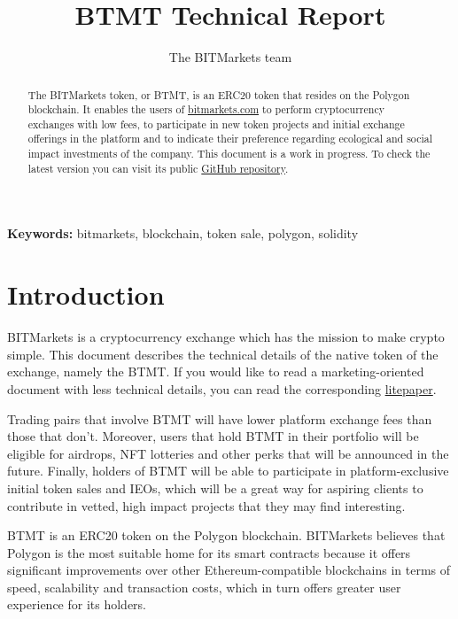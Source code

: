 \documentclass[a4paper,12pt]{article}
\title{BTMT Technical Report}
\author{The BITMarkets team}
\providecommand{\keywords}[1]{\textbf{Keywords: } #1}
\begin{document}
\maketitle

\begin{abstract}

The BITMarkets token, or BTMT, is an ERC20 token that resides on the Polygon blockchain. It enables the users of \href{https://bitmarkets.com}{bitmarkets.com} to perform cryptocurrency exchanges with low fees,
to participate in new token projects and initial exchange offerings in the platform and to
indicate their preference regarding ecological and social impact investments of the company.
This document is a work in progress. To check the latest version you can visit its public \href{https://github.com/UAB-BITmarkets/whitepaper}{GitHub repository}.

\end{abstract}

\keywords{bitmarkets, blockchain, token sale, polygon, solidity}

\section{Introduction}

BITMarkets is a cryptocurrency exchange which has the mission to make crypto simple.
This document describes the technical details of the native token of the exchange, namely the BTMT.
If you would like to read a marketing-oriented document with less technical details, you can read the corresponding \href{https://bitmarkets.com/en/documents/BTMT_Litepaper}{litepaper}.

Trading pairs that involve BTMT will have lower platform exchange fees than those that don't.
Moreover, users that hold BTMT in their portfolio will be eligible for airdrops, NFT lotteries and other perks that will be announced in the future.
Finally, holders of BTMT will be able to participate in platform-exclusive initial token sales and IEOs,
which will be a great way for aspiring clients to contribute in vetted, high impact projects that they may find interesting.

BTMT is an ERC20 token on the Polygon blockchain. BITMarkets believes that Polygon is the most suitable home for its smart contracts because it offers significant improvements over other Ethereum-compatible blockchains in terms of speed, scalability and transaction costs, which in turn offers greater user experience for its holders.
\end{document}
